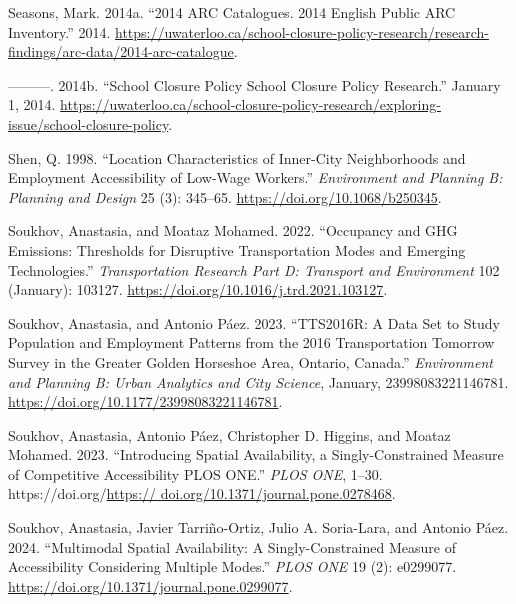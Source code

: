 \documentclass[
default
]{sn-jnl}
\newlength{\cslhangindent}
\newenvironment{CSLReferences}[2] %
 {\begin{list}{}{%
  \setlength{\itemindent}{0pt}
  \setlength{\leftmargin}{0pt}
  \setlength{\parsep}{0pt}
  \ifodd #1
   \setlength{\leftmargin}{\cslhangindent}
   \setlength{\itemindent}{-1\cslhangindent}
  \fi
  \setlength{\itemsep}{#2\baselineskip}}}
 {\end{list}}
\begin{document}
\begin{CSLReferences}{1}{0}
Seasons, Mark. 2014a. {``2014 {ARC} Catalogues. 2014 English Public
{ARC} Inventory.''} 2014.
\url{https://uwaterloo.ca/school-closure-policy-research/research-findings/arc-data/2014-arc-catalogue}.

---------. 2014b. {``School Closure Policy {\textbar} School Closure
Policy Research.''} January 1, 2014.
\url{https://uwaterloo.ca/school-closure-policy-research/exploring-issue/school-closure-policy}.

Shen, Q. 1998. {``Location Characteristics of Inner-City Neighborhoods
and Employment Accessibility of Low-Wage Workers.''} \emph{Environment
and Planning B: Planning and Design} 25 (3): 345--65.
\url{https://doi.org/10.1068/b250345}.

Soukhov, Anastasia, and Moataz Mohamed. 2022. {``Occupancy and {GHG}
Emissions: Thresholds for Disruptive Transportation Modes and Emerging
Technologies.''} \emph{Transportation Research Part D: Transport and
Environment} 102 (January): 103127.
\url{https://doi.org/10.1016/j.trd.2021.103127}.

Soukhov, Anastasia, and Antonio Páez. 2023. {``{TTS}2016R: A Data Set to
Study Population and Employment Patterns from the 2016 Transportation
Tomorrow Survey in the Greater Golden Horseshoe Area, Ontario,
Canada.''} \emph{Environment and Planning B: Urban Analytics and City
Science}, January, 23998083221146781.
\url{https://doi.org/10.1177/23998083221146781}.

Soukhov, Anastasia, Antonio Páez, Christopher D. Higgins, and Moataz
Mohamed. 2023. {``Introducing Spatial Availability, a Singly-Constrained
Measure of Competitive Accessibility \textbar{} {PLOS ONE}.''}
\emph{PLOS ONE}, 1--30.
https://doi.org/\href{https://\%20doi.org/10.1371/journal.pone.0278468}{https://
doi.org/10.1371/journal.pone.0278468}.

Soukhov, Anastasia, Javier Tarriño-Ortiz, Julio A. Soria-Lara, and
Antonio Páez. 2024. {``Multimodal Spatial Availability: A
Singly-Constrained Measure of Accessibility Considering Multiple
Modes.''} \emph{{PLOS} {ONE}} 19 (2): e0299077.
\url{https://doi.org/10.1371/journal.pone.0299077}.


\end{CSLReferences}
\end{document}

